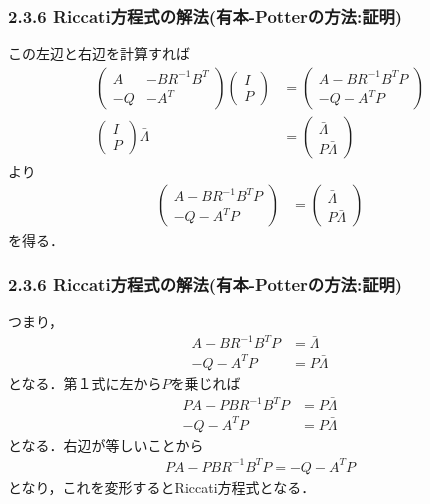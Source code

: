 \begin{frame}[t]
\frametitle{2.3.6 Riccati方程式の解法(有本-Potterの方法:証明)}
この左辺と右辺を計算すれば
\begin{align}
	\left(\begin{array}{cc}
	       A  & - B R^{-1} B^T \\
	       -Q & - A^T
	\end{array}\right)
		 \left(\begin{array}{c}
		      I \\
		      P
		\end{array}\right)
	&= 
	\left(\begin{array}{c}
	       A  - B R^{-1} B^T P \\
	       -Q - A^T P
	\end{array}\right)
\nonumber \\
		 \left(\begin{array}{cccc}
		      I \\
		      P
		\end{array}\right)
		\bar{\Lambda}
		& = 
		 \left(\begin{array}{cccc}
		      \bar{\Lambda} \\
		      P \bar{\Lambda}
		\end{array}\right)
\nonumber 
\end{align}
より
\begin{align}
	\left(\begin{array}{c}
	       A  - B R^{-1} B^T P \\
	       -Q - A^T P
	\end{array}\right)
		& = 
		 \left(\begin{array}{cccc}
		      \bar{\Lambda} \\
		      P \bar{\Lambda}
		\end{array}\right)
\nonumber 
\end{align}
を得る．
\end{frame}

\begin{frame}[t]
\frametitle{2.3.6 Riccati方程式の解法(有本-Potterの方法:証明)}
つまり，
\begin{align}
	       A  - B R^{-1} B^T P & = \bar{\Lambda} 
\nonumber \\
	       -Q - A^T P & = P \bar{\Lambda}
\nonumber 
\end{align}
となる．第１式に左から$P$を乗じれば
\begin{align}
	       P A  - P B R^{-1} B^T P & = P \bar{\Lambda} 
\nonumber \\
	       -Q - A^T P & = P \bar{\Lambda}
\nonumber
\end{align}
となる．右辺が等しいことから
\begin{align}
	       P A  - P B R^{-1} B^T P = -Q - A^T P
\nonumber
\end{align}
となり，これを変形するとRiccati方程式となる．
\end{frame}

